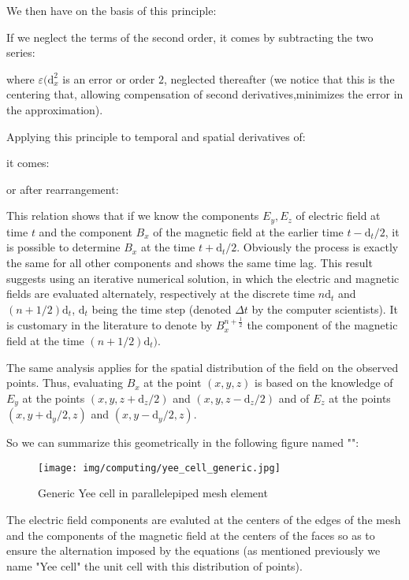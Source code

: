 	We then have on the basis of this principle:
	
	If we neglect the terms of the second order, it comes by subtracting the two series:
	
	where $\varepsilon(\mathrm{d}_x^2$ is an error or order $2$, neglected thereafter (we notice that this is the centering that, allowing compensation of second derivatives,minimizes the error in the approximation).
	
	Applying this principle to temporal and spatial derivatives of:
	
	it comes:
	
	or after rearrangement:
	
	This relation shows that if we know the components $E_y,E_z$ of electric field at time $t$ and the component $B_x$ of the magnetic field at the earlier time $t-\mathrm{d}_t/2$, it is possible to determine $B_x$ at the time $t+\mathrm{d}_t/2$. Obviously the process is exactly the same for all other components and shows the same time lag. This result suggests using an iterative numerical solution, in which the electric and magnetic fields are evaluated alternately, respectively at the discrete time $n\mathrm{d}_t$ and $(n+1/2)\mathrm{d}_t$, $\mathrm{d}_t$ being the time step (denoted $\Delta t$ by the computer scientists). It is customary in the literature to denote by $B_x^{n+\frac{1}{2}}$ the component of the magnetic field at the time $(n+1/2)\mathrm{d}_t)$.
	
	The same analysis applies for the spatial distribution of the field on the observed points. Thus, evaluating $B_x$ at the point $(x,y,z)$ is based on the knowledge of $E_y$ at the points $(x,y,z+\mathrm{d}_z/2)$ and $(x,y,z-\mathrm{d}_z/2)$  and of $E_z$ at the points $(x,y+\mathrm{d}_y/2,z)$ and $(x,y-\mathrm{d}_y/2,z)$.

	So we can summarize this geometrically in the following figure named "":
	\begin{figure}[H]
		\centering
		\texttt{[image: img/computing/yee\_cell\_generic.jpg]}
		\caption{Generic Yee cell in parallelepiped mesh element}
	\end{figure}
	The electric field components are evaluted at the centers of the edges of the mesh and the components of the magnetic field at the centers of the faces so as to ensure the alternation imposed by the equations (as mentioned previously we name "Yee cell" the unit cell with this distribution of points).
	
